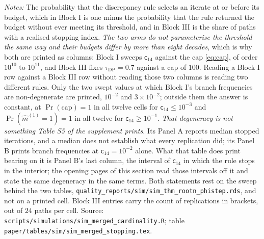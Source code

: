 \documentclass[
  12pt]{article}
\newcommand{\1}[1]{\mathds{1}\left[#1\right]}
\theoremstyle{plain}
\theoremstyle{definition}
\theoremstyle{definition}
\theoremstyle{remark}
\begin{document}
\begin{table}[!htbp]
\centering
\begin{threeparttable}
\caption{The one statistic both $\varphi$-step arms measure}
\label{tab:sim-merged-stopping}
\footnotesize

\begin{tablenotes}\footnotesize
\item \textit{Notes:} The probability that the discrepancy rule selects an
iterate at or before its budget, which in Block I is one minus the probability
that the rule returned the budget without ever meeting its threshold, and in
Block III is the share of paths with a realised stopping index. \emph{The two
arms do not parameterise the threshold the same way and their budgets differ by
more than eight decades}, which is why both are printed as columns: Block I
sweeps $\mathsf c_{14}$ against the cap \eqref{eq:cap}, of order $10^{10}$ to
$10^{11}$, and Block III fixes $\tau_{\mathrm{DP}}=0.7$ against a cap of $100$.
Reading a
Block I row against a Block III row without reading those two columns is reading
two different rules. Only the two swept values at which Block I's branch
frequencies are non-degenerate are printed, $10^{-2}$ and $3\times10^{-2}$;
outside them the answer is constant, at
$\Pr(\text{cap})=1$ in all twelve cells for $\mathsf c_{14}\le10^{-3}$ and
$\Pr(\hat m^{(1)}{=}1)=1$ in all twelve for $\mathsf c_{14}\ge10^{-1}$.
\emph{That degeneracy is not something Table S5 of the supplement prints.} Its
Panel A reports median stopped iterations, and a median does not establish what
every replication did; its Panel B prints branch frequencies at
$\mathsf c_{14}=10^{-2}$ alone. What that table does print bearing on it is
Panel B's last column, the interval of $\mathsf c_{14}$ in which the rule stops
in the interior; the opening pages of this section read those intervals off it
and state the same degeneracy in the same terms. Both statements rest on the sweep behind the two
tables, \texttt{quality\_reports/sim/sim\_thm\_rootn\_phistep.rds}, and not on
a printed cell. Block III entries carry the count of
replications in brackets, out of $24$ paths per cell. Source:
\texttt{scripts/simulations/sim\_merged\_cardinality.R}; table
\texttt{paper/tables/sim/sim\_merged\_stopping.tex}.
\end{tablenotes}
\end{threeparttable}
\end{table}
\end{document}
